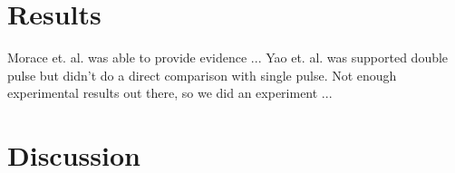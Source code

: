 \section{Results}
Morace et. al. \cite{Morace_2019_Nat_Comm} was able to provide evidence ... Yao et. al. \cite{Yao_2024_MaRaE} was supported double pulse but didn't do a direct comparison with single pulse. Not enough experimental results out there, so we did an experiment ...

\section{Discussion}

